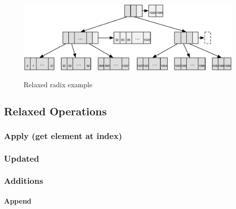 \begin{figure}[h!]
  \centering
  \includegraphics[width=\textwidth]{Figures/Relaxed_radix_example}
  \label{Relaxed_radix_example}
  \caption{Relaxed radix example}
\end{figure}

\subsection{Relaxed Operations}


\subsubsection{Apply (get element at index)}



\subsubsection{Updated}


\subsubsection{Additions}

\paragraph{Append}

